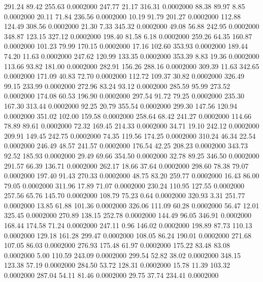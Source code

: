  291.24   89.42  255.63   0.0002000
 247.77   21.17  316.31   0.0002000
  88.38   89.97    8.85   0.0002000
  20.11   71.84  236.56   0.0002000
  10.19   91.79  201.27   0.0002000
 112.88  124.49  308.56   0.0002000
  21.30    7.33  345.32   0.0002000
  49.08   56.88  242.95   0.0002000
 348.87  123.15  327.12   0.0002000
 198.40   81.58    6.18   0.0002000
 259.26   64.35  160.87   0.0002000
 101.23   79.99  170.15   0.0002000
  17.16  102.60  353.93   0.0002000
 189.44   74.20   11.63   0.0002000
 247.62  120.99  133.35   0.0002000
 353.39    8.83   19.36   0.0002000
 113.66   93.82  181.00   0.0002000
 282.91  156.26  288.16   0.0002000
 309.39   11.63  342.65   0.0002000
 171.09   40.83   72.70   0.0002000
 112.72  109.37   30.82   0.0002000
 326.49   99.15  233.99   0.0002000
 272.96   83.24   93.12   0.0002000
 285.59   95.99  273.52   0.0002000
 174.08   60.53  196.90   0.0002000
 297.54   91.72   79.25   0.0002000
 235.30  167.30  313.44   0.0002000
  92.25   20.79  355.54   0.0002000
 299.30  147.56  120.94   0.0002000
 351.02  102.00  159.58   0.0002000
 258.64   68.42  241.27   0.0002000
 114.66   78.89   89.61   0.0002000
  72.32  169.45  214.33   0.0002000
  34.71   19.10  242.12   0.0002000
 209.91  149.45  242.75   0.0002000
  74.35  119.56  174.25   0.0002000
 310.24   46.34   22.54   0.0002000
 246.49   48.57  241.57   0.0002000
 176.54   42.25  208.23   0.0002000
 343.73   92.52  185.93   0.0002000
  29.49   69.66  354.50   0.0002000
  32.78   89.25  346.50   0.0002000
 291.57   66.39  136.71   0.0002000
 262.17   18.66   37.64   0.0002000
 298.60   78.38   79.07   0.0002000
 197.40   91.43  270.33   0.0002000
  48.75   83.20  259.77   0.0002000
  16.43   86.00   79.05   0.0002000
 311.96   17.89   71.07   0.0002000
 230.24  110.95  127.55   0.0002000
 257.56   65.76  145.70   0.0002000
 108.79   75.23    0.64   0.0002000
 320.93    3.31  251.77   0.0002000
  13.85   61.88  101.36   0.0002000
 326.06  111.09   60.28   0.0002000
  56.47   12.01  325.45   0.0002000
 270.89  138.15  252.78   0.0002000
 144.49   96.05  346.91   0.0002000
 168.44  174.58   71.24   0.0002000
 247.11    0.96  146.02   0.0002000
 198.89   87.73  110.13   0.0002000
 129.18  161.28  299.47   0.0002000
 108.05   86.24  190.01   0.0002000
 271.68  107.05   86.03   0.0002000
 276.93  175.48   61.97   0.0002000
 175.22   83.48   83.08   0.0002000
   5.00  110.59  243.09   0.0002000
 299.54   52.82   38.02   0.0002000
 348.15  123.38   57.19   0.0002000
 284.50   53.72  128.31   0.0002000
  15.78   11.39  103.32   0.0002000
 287.04   54.11   81.46   0.0002000
  29.75   37.74  234.41   0.0002000

